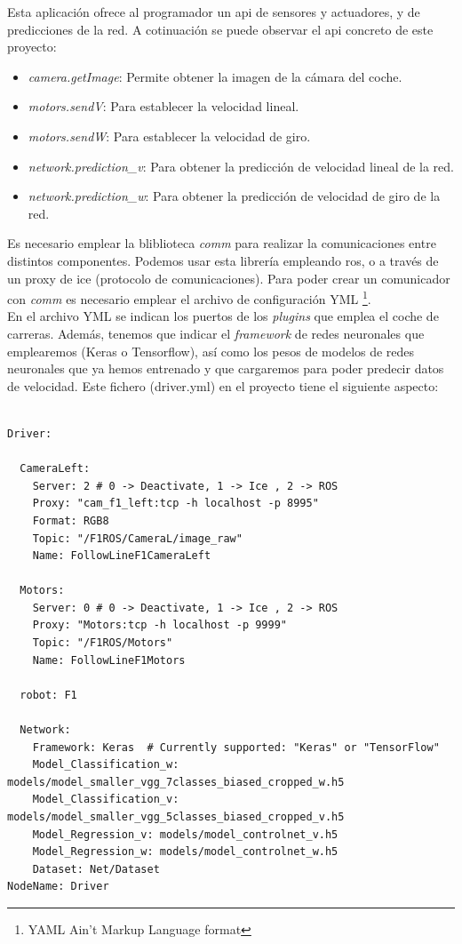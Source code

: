 Esta aplicación ofrece al programador un \acrfull{api} de sensores y actuadores, y de predicciones de la red. A cotinuación se puede observar el \acrshort{api} concreto de este proyecto:

\begin{itemize}
    \item \textit{camera.getImage}: Permite obtener la imagen de la cámara del coche.
    
    \item \textit{motors.sendV}: Para establecer la velocidad lineal.
    
    \item \textit{motors.sendW}: Para establecer la velocidad de giro.
    
    \item \textit{network.prediction\_v}: Para obtener la predicción de velocidad lineal de la red.
    
    \item \textit{network.prediction\_w}: Para obtener la predicción de velocidad de giro de la red.
\end{itemize}

Es necesario emplear la bliblioteca \textit{comm} para realizar la comunicaciones entre distintos componentes. Podemos usar esta librería empleando \acrshort{ros}, o a través de un proxy de \acrshort{ice} (protocolo de comunicaciones). Para poder crear un comunicador con \textit{comm} es necesario emplear el archivo de configuración YML \footnote{YAML Ain't Markup Language format}.\\

En el archivo YML se indican los puertos de los \textit{plugins} que emplea el coche de carreras. Además, tenemos que indicar el \textit{framework} de redes neuronales que emplearemos (Keras o Tensorflow), así como los pesos de modelos de redes neuronales que ya hemos entrenado y que cargaremos para poder predecir datos de velocidad. Este fichero (driver.yml) en el proyecto tiene el siguiente aspecto:\\


\vspace{10pt}
\begin{lstlisting}

Driver:

  CameraLeft:
    Server: 2 # 0 -> Deactivate, 1 -> Ice , 2 -> ROS
    Proxy: "cam_f1_left:tcp -h localhost -p 8995"
    Format: RGB8
    Topic: "/F1ROS/CameraL/image_raw"
    Name: FollowLineF1CameraLeft

  Motors:
    Server: 0 # 0 -> Deactivate, 1 -> Ice , 2 -> ROS
    Proxy: "Motors:tcp -h localhost -p 9999"
    Topic: "/F1ROS/Motors"
    Name: FollowLineF1Motors

  robot: F1

  Network:
    Framework: Keras  # Currently supported: "Keras" or "TensorFlow"
    Model_Classification_w: models/model_smaller_vgg_7classes_biased_cropped_w.h5
    Model_Classification_v: models/model_smaller_vgg_5classes_biased_cropped_v.h5
    Model_Regression_v: models/model_controlnet_v.h5
    Model_Regression_w: models/model_controlnet_w.h5
    Dataset: Net/Dataset
NodeName: Driver
\end{lstlisting}
\vspace{20pt}

